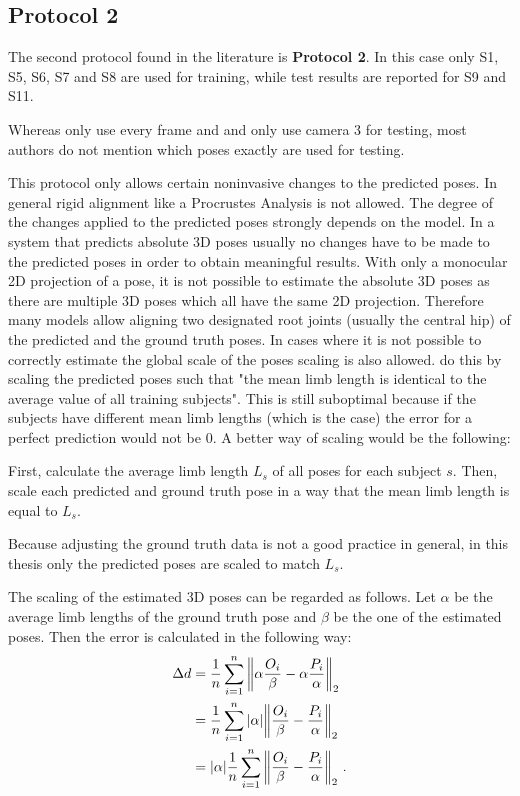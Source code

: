 \subsection{Protocol 2}\label{sec:protocol2}

The second protocol found in the literature is \textbf{Protocol 2}.
In this case only S1, S5, S6, S7 and S8 are used for training, while test results are reported for S9 and S11.

Whereas \citet{sun17} only use every  frame and \citet{moreno-noguer16} and \citet{bogo16} only use camera 3 for testing, most authors do not mention which poses exactly are used for testing.

This protocol only allows certain noninvasive changes to the predicted poses.
In general rigid alignment like a Procrustes Analysis is not allowed.
The degree of the changes applied to the predicted poses strongly depends on the model.
In a system that predicts absolute 3D poses usually no changes have to be made to the predicted poses in order to obtain meaningful results.
With only a monocular 2D projection of a pose, it is not possible to estimate the absolute 3D poses as there are multiple 3D poses which all have the same 2D projection.
Therefore many models \cite{martinez17, zhou18, zhou16, tekin16, pavlakos17} allow aligning two designated root joints (usually the central hip) of the predicted and the ground truth poses.
In cases where it is not possible to correctly estimate the global scale of the poses scaling is also allowed.
\citet{zhou18} do this by scaling the predicted poses such that "the mean limb length is identical to the average value of all training subjects".
This is still suboptimal because if the subjects have different mean limb lengths (which is the case) the error for a perfect prediction would not be 0.
A better way of scaling would be the following:

First, calculate the average limb length $L_s$ of all poses for each subject $s$.
Then, scale each predicted and ground truth pose in a way that the mean limb length is equal to $L_s$.

Because adjusting the ground truth data is not a good practice in general, in this thesis only the predicted poses are scaled to match $L_s$.

The scaling of the estimated 3D poses can be regarded as follows. Let $\alpha$ be the average limb lengths of the ground truth pose and $\beta$ be the one of the estimated poses.
Then the error is calculated in the following way:
\begin{align}
	\Delta d &= \frac{1}{n} \sum_{i = 1}^{n}  \norm{\alpha \frac{O_i}{\beta} - \alpha \frac{P_i}{\alpha}}_2 \\
	&=  \frac{1}{n} \sum_{i = 1}^{n} \abs{\alpha} \norm{\frac{O_i}{\beta} -\frac{P_i}{\alpha}}_2 \\
	&=  \abs{\alpha} \frac{1}{n} \sum_{i = 1}^{n} \norm{\frac{O_i}{\beta} -\frac{P_i}{\alpha}}_2 \ .
	\label{eq:protocol2-mpjpe-scaling}
\end{align}

